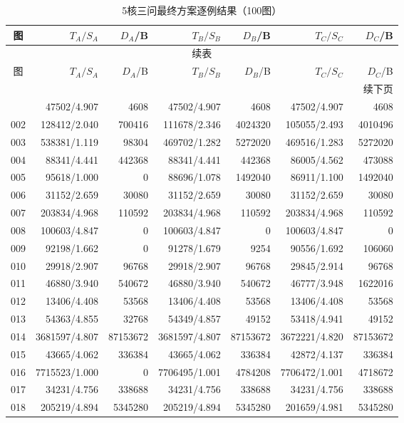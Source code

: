 \begin{longtable}{crrrrrr}
\caption{5核三问最终方案逐例结果（100图）}\label{tab:v7-detail-5}\\
\toprule
图 & $T_A/S_A$ & $D_A$/B & $T_B/S_B$ & $D_B$/B & $T_C/S_C$ & $D_C$/B \\
\midrule
\endfirsthead
\multicolumn{7}{c}{续表}\\
\toprule
图 & $T_A/S_A$ & $D_A$/B & $T_B/S_B$ & $D_B$/B & $T_C/S_C$ & $D_C$/B \\
\midrule
\endhead
\midrule\multicolumn{7}{r}{续下页}\\
\endfoot
\bottomrule
\endlastfoot
001 & 47502/4.907 & 4608 & 47502/4.907 & 4608 & 47502/4.907 & 4608 \\
002 & 128412/2.040 & 700416 & 111678/2.346 & 4024320 & 105055/2.493 & 4010496 \\
003 & 538381/1.119 & 98304 & 469702/1.282 & 5272020 & 469516/1.283 & 5272020 \\
004 & 88341/4.441 & 442368 & 88341/4.441 & 442368 & 86005/4.562 & 473088 \\
005 & 95618/1.000 & 0 & 88696/1.078 & 1492040 & 86911/1.100 & 1492040 \\
006 & 31152/2.659 & 30080 & 31152/2.659 & 30080 & 31152/2.659 & 30080 \\
007 & 203834/4.968 & 110592 & 203834/4.968 & 110592 & 203834/4.968 & 110592 \\
008 & 100603/4.847 & 0 & 100603/4.847 & 0 & 100603/4.847 & 0 \\
009 & 92198/1.662 & 0 & 91278/1.679 & 9254 & 90556/1.692 & 106060 \\
010 & 29918/2.907 & 96768 & 29918/2.907 & 96768 & 29845/2.914 & 96768 \\
011 & 46880/3.940 & 540672 & 46880/3.940 & 540672 & 46777/3.948 & 1622016 \\
012 & 13406/4.408 & 53568 & 13406/4.408 & 53568 & 13406/4.408 & 53568 \\
013 & 54363/4.855 & 32768 & 54349/4.857 & 49152 & 53418/4.941 & 49152 \\
014 & 3681597/4.807 & 87153672 & 3681597/4.807 & 87153672 & 3672221/4.820 & 87153672 \\
015 & 43665/4.062 & 336384 & 43665/4.062 & 336384 & 42872/4.137 & 336384 \\
016 & 7715523/1.000 & 0 & 7706495/1.001 & 4784208 & 7706472/1.001 & 4718672 \\
017 & 34231/4.756 & 338688 & 34231/4.756 & 338688 & 34231/4.756 & 338688 \\
018 & 205219/4.894 & 5345280 & 205219/4.894 & 5345280 & 201659/4.981 & 5345280 \\

\end{longtable}

